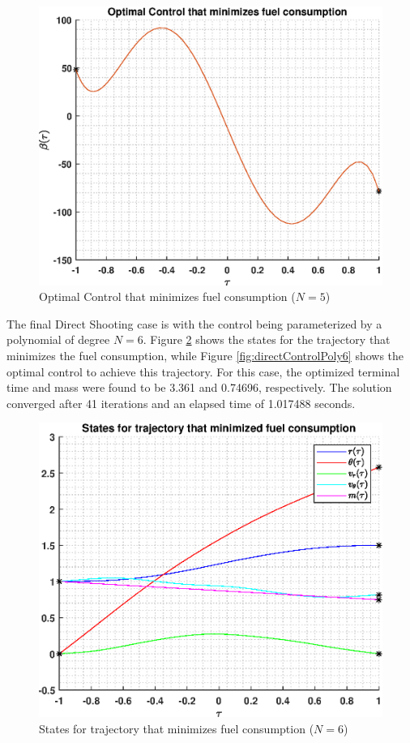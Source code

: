\documentclass[]{article}
\begin{document}
\begin{figure}
	\centering
	\includegraphics[scale=0.75]{directControlPoly5.eps}
	\caption{Optimal Control that minimizes fuel consumption (\(N = 5\))}
	\label{fig:directControlPoly5}
\end{figure}
\vspace{2mm}\newline 
The final Direct Shooting case is with the control being parameterized by a polynomial of degree \(N = 6\). Figure \ref{fig:directStatesPoly6} shows the states for the trajectory that minimizes the fuel consumption, while Figure \ref{fig:directControlPoly6} shows the optimal control to achieve this trajectory. For this case, the optimized terminal time and mass were found to be 3.361 and 0.74696, respectively. The solution converged after 41 iterations and an elapsed time of 1.017488 seconds.
\begin{figure}
	\centering
	\includegraphics[scale=0.75]{directStatesPoly6.eps}
	\caption{States for trajectory that minimizes fuel consumption (\(N = 6\))}
	\label{fig:directStatesPoly6}
\end{figure}
\end{document}
